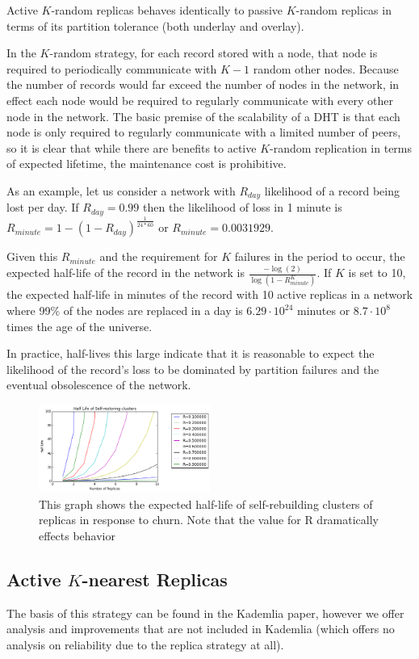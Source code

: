 	Active $K$-random replicas behaves identically to passive $K$-random replicas in terms of its partition tolerance (both underlay and overlay).
	
	In the $K$-random strategy, for each record stored with a node, that node is required to periodically communicate with $K-1$ random other nodes.
	Because the number of records would far exceed the number of nodes in the network, in effect each node would be required to regularly communicate with every other node in the network.
	The basic premise of the scalability of a DHT is that each node is only required to regularly communicate with a limited number of peers, so it is clear that while there are benefits to active $K$-random replication in terms of expected lifetime, the maintenance cost is prohibitive.
	
	
	As an example, let us consider a network with $R_{day}$ likelihood of a record being lost per day.
	If $R_{day}=0.99$ then the likelihood of loss in 1 minute is $R_{minute} = 1-(1-R_{day})^{\frac{1}{24*60}}$ or $R_{minute} = 0.0031929$. 
	
	Given this $R_{minute}$ and the requirement for $K$ failures in the period to occur, the expected half-life of the record in the network is $\frac{-\log(2)}{\log(1-R_{minute}^{K})}$.
	If $K$ is set to 10, the expected half-life in minutes of the record with 10 active replicas in a network where 99\% of the nodes are replaced in a day is $6.29  \cdot 10^{24}$ minutes or $8.7 \cdot 10^{8}$ times the age of the universe.
	
	In practice, half-lives this large indicate that it is reasonable to expect the likelihood of the record's loss to  be dominated by partition failures and the eventual obsolescence of the network.
	
	\begin{figure}[h!]
		\includegraphics[width=0.5\textwidth]{figs/self_healing}
		\caption{This graph shows the expected half-life of self-rebuilding clusters of replicas in response to churn. Note that the value for R dramatically effects behavior}
	\end{figure}
	
	
	\subsection{Active $K$-nearest Replicas}
	The basis of this strategy can be found in the Kademlia \cite{kademlia} paper, however we offer analysis and improvements that are not included in Kademlia (which offers no analysis on reliability due to the replica strategy at all).
	
